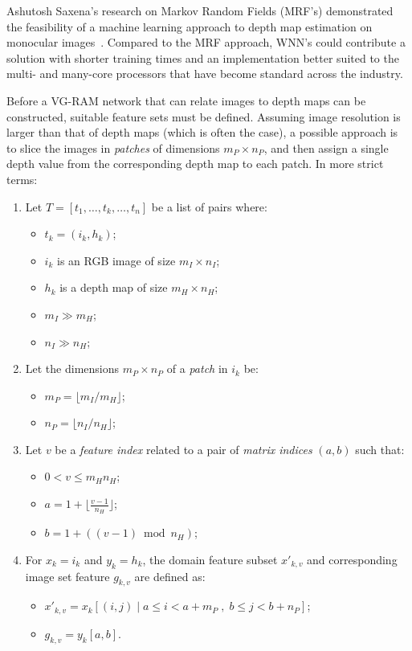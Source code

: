\documentclass[twocolumn, 9pt]{jsproceedings}
\begin{document}
Ashutosh Saxena's research on Markov Random Fields (MRF's) demonstrated the feasibility of a machine learning approach to depth map estimation on monocular images~\cite{saxena08}. Compared to the MRF approach, WNN's could contribute a solution with shorter training times and an implementation better suited to the multi- and many-core processors that have become standard across the industry.

Before a VG-RAM network that can relate images to depth maps can be constructed, suitable feature sets must be defined. Assuming image resolution is larger than that of depth maps (which is often the case), a possible approach is to slice the images in {\it patches} of dimensions \(m_P \times n_P\), and then assign a single depth value from the corresponding depth map to each patch. In more strict terms:

\begin{enumerate}
\item Let \(T = [t_1, \dotsc, t_k, \dotsc, t_n]\) be a list of pairs where:
\begin{itemize}
\item \(t_k = (i_k, h_k)\);
\item \(i_k\) is an RGB image of size \(m_I \times n_I\);
\item \(h_k\) is a depth map of size \(m_H \times n_H\);
\item \(m_I \gg m_H\);
\item \(n_I \gg n_H\);
\end{itemize}
\item Let the dimensions \(m_P \times n_P\) of a {\it patch} in \(i_k\) be:
\begin{itemize}
\item \(m_P = \lfloor m_I / m_H \rfloor\);
\item \(n_P = \lfloor n_I / n_H \rfloor\);
\end{itemize}
\item Let \(v\) be a {\it feature index} related to a pair of {\it matrix indices} \((a, b)\) such that:
\begin{itemize}
\item \(0 < v \leq m_H n_H\);
\item \(a = 1 + \lfloor \frac{v - 1}{n_H} \rfloor\);
\item\(b = 1 + ((v - 1) \bmod n_H)\);
\end{itemize}
\item For \(x_k = i_k\) and \(y_k = h_k\), the domain feature subset \(x'_{k,v}\) and corresponding image set feature \(g_{k,v}\) are defined as:
\begin{itemize}
\item \(x'_{k,v} = x_k[(i, j) \; | \; a \leq i < a + m_P \; , \; b \leq j < b + n_P]\);
\item \(g_{k,v} = y_k[a, b]\).
\end{itemize}
\end{enumerate}
\end{document}
